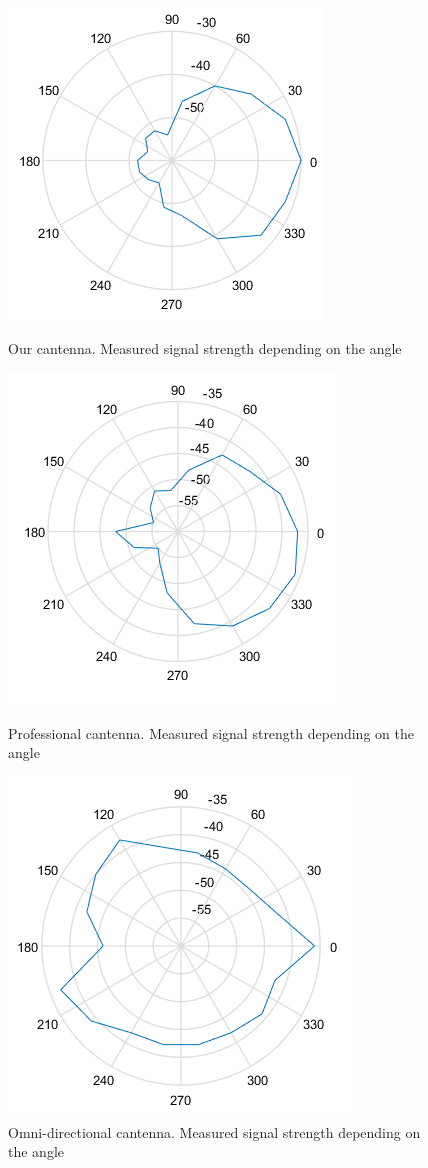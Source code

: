 		\begin{figure}\begin{center}
				\includegraphics[width=.45\textwidth]{plots/cantenna_power_cut.png}
				\caption{Our cantenna. Measured signal strength depending on the angle}
				\label{img:ang:pow:can}
				
				\includegraphics[width=.45\textwidth]{plots/prof_power_cut.png}
				\caption{Professional cantenna. Measured signal strength depending on the angle}
				\label{img:ang:pow:prof}
				
				\includegraphics[width=.45\textwidth]{plots/poer_omni_cut.png}
				\caption{Omni-directional cantenna. Measured signal strength depending on the angle}
				\label{img:ang:pow:omni}
			\end{center}\end{figure}
			
